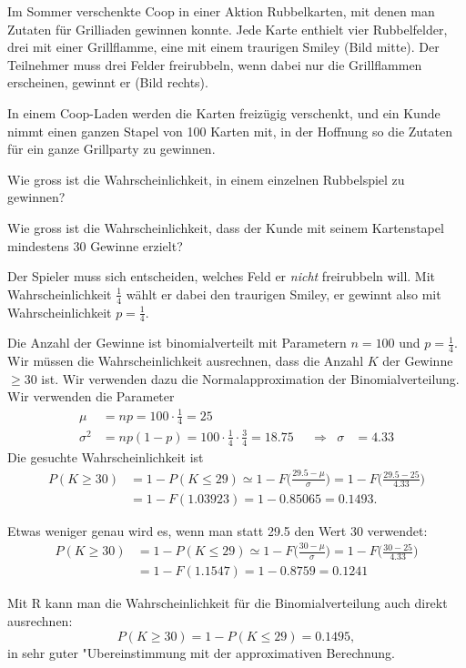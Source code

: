 Im Sommer verschenkte Coop in einer Aktion Rubbelkarten, mit denen
man Zutaten für Grilliaden gewinnen konnte.
Jede Karte enthielt vier Rubbelfelder, drei mit einer Grillflamme,
eine mit einem traurigen Smiley (Bild mitte).
Der Teilnehmer muss drei Felder freirubbeln, wenn dabei nur die Grillflammen
erscheinen, gewinnt er (Bild rechts).
\begin{center}
\end{center}
In einem Coop-Laden werden die Karten freizügig verschenkt, und ein Kunde
nimmt einen ganzen Stapel von 100 Karten mit, in der Hoffnung so die Zutaten
für ein ganze Grillparty zu gewinnen.

\begin{teilaufgaben}
\item Wie gross ist die Wahrscheinlichkeit, in einem einzelnen Rubbelspiel zu
gewinnen?
\item Wie gross ist die Wahrscheinlichkeit, dass der Kunde mit seinem 
Kartenstapel mindestens  30 Gewinne erzielt?
\end{teilaufgaben}

\begin{loesung}
\begin{teilaufgaben}
\item
Der Spieler muss sich entscheiden, welches Feld er {\em nicht} freirubbeln will.
Mit Wahrscheinlichkeit $\frac14$ wählt er dabei den traurigen Smiley,
er gewinnt also mit Wahrscheinlichkeit $p=\frac14$.
\item
Die Anzahl der Gewinne ist binomialverteilt mit Parametern $n=100$ und
$p=\frac14$.
Wir müssen die Wahrscheinlichkeit ausrechnen, dass die Anzahl $K$ der
Gewinne $\ge 30$ ist. 
Wir verwenden dazu die Normalapproximation der Binomialverteilung.
Wir verwenden die Parameter
\[
\begin{aligned}
\mu&=np = 100\cdot \frac14=25\\
\sigma^2&=np(1-p)=100\cdot\frac14\cdot\frac34=18.75&&\Rightarrow&\sigma&=4.33
\end{aligned}
\]
Die gesuchte Wahrscheinlichkeit ist
\begin{align*}
P(K\ge 30)
&=1-P(K \le 29)
\simeq
1-F\biggl(\frac{29.5-\mu}{\sigma}\biggr)
=
1-F\biggl(\frac{29.5-25}{4.33}\biggr)
\\
&=
1-F(1.03923)=1-0.85065=0.1493.
\end{align*}

Etwas weniger genau wird es, wenn man statt 29.5 den Wert 30 verwendet:
\begin{align*}
P(K\ge 30)
&=1-P(K \le 29)
\simeq
1-F\biggl(\frac{30-\mu}{\sigma}\biggr)
=
1-F\biggl(\frac{30-25}{4.33}\biggr)
\\
&=
1-F(1.1547)=1-0.8759=0.1241
\end{align*}


Mit R kann man die Wahrscheinlichkeit für die Binomialverteilung
auch direkt ausrechnen:
\[
P(K\ge 30)
=1-P(K\le 29)=0.1495,
\]
in sehr guter "Ubereinstimmung mit der approximativen Berechnung.
\qedhere
\end{teilaufgaben}
\end{loesung}

